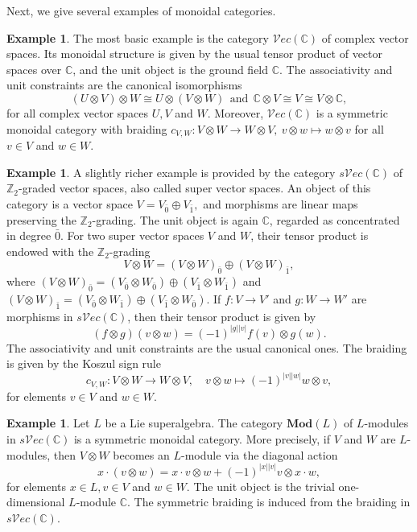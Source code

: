 \documentclass[11pt]{amsart}
\newcommand{\bbC}{\mathbb{C}}
\newcommand{\bbZ}{\mathbb{Z}}
\theoremstyle{definition}
\newtheorem{exam}[theo]{Example}
\numberwithin{equation}{section}
\begin{document}
Next, we give several examples of monoidal categories.
		
\begin{exam}
The most basic example is the category $\mathcal{V}ec(\bbC)$ of complex vector spaces. 
Its monoidal structure is given by the usual tensor product of vector spaces over $\mathbb{C}$, and the unit object is the ground field $\mathbb{C}$. 
The associativity and unit constraints are the canonical isomorphisms
 \[(U\otimes V) \otimes W \cong U\otimes (V\otimes W) \ \  \mathrm{and} \ \ \bbC\otimes V \cong V \cong V\otimes \bbC,   \]
for all complex vector spaces $U,V$ and $W$. 
Moreover, $\mathcal{V}ec(\bbC)$ is a symmetric monoidal category with braiding $c_{V,W}: V\otimes W \to W\otimes V, \ v\otimes w \mapsto w \otimes v$ for all $v\in V$ and $w \in W$.
\end{exam}
		
\begin{exam}
A slightly richer example is provided by the category $s\mathcal{V}ec(\bbC)$ of $\bbZ_2$-graded vector spaces, also called super vector spaces. 
An object of this category is a vector space $V=V_{\bar 0}\oplus V_{\bar 1},$ and morphisms are linear maps preserving the $\mathbb{Z}_2$-grading. The unit object is again $\mathbb{C}$, regarded as concentrated in degree $\bar 0$.
For two super vector spaces $V$ and $W$, their tensor product is endowed with the $\mathbb{Z}_2$-grading
\[
V\otimes W=(V\otimes W)_{\bar 0}\oplus (V\otimes W)_{\bar 1},
\]
where
$(V\otimes W)_{\bar 0}
=(V_{\bar 0}\otimes W_{\bar 0})
\oplus
(V_{\bar 1}\otimes W_{\bar 1})
$
and
$(V\otimes W)_{\bar 1}
=(V_{\bar 0}\otimes W_{\bar 1})
\oplus
(V_{\bar 1}\otimes W_{\bar 0}).
$
If $f:V\to V'$ and $g:W\to W'$ are morphisms in $s\mathcal{V}ec(\mathbb{C})$, then their tensor product is given by
\[
(f\otimes g)(v\otimes w)=(-1)^{|g||v|}f(v)\otimes g(w).
\]
The associativity and unit constraints are the usual canonical ones. The braiding is given by the Koszul sign rule
\[
c_{V,W}:V\otimes W\longrightarrow W\otimes V,
\quad
v\otimes w\longmapsto (-1)^{|v||w|}w\otimes v,
\]
for elements $v\in V$ and $w\in W$.
\end{exam}
		
\begin{exam}
Let $L$ be a Lie superalgebra. The category $\mathbf{Mod}(L)$ of  $L$-modules in $s\mathcal{V}ec(\mathbb{C})$ is a symmetric monoidal category. More precisely, if $V$ and $W$ are $L$-modules, then $V\otimes W$ becomes an $L$-module via the diagonal action
\[
x\cdot (v\otimes w)
=
x\cdot v\otimes w
+
(-1)^{|x||v|}v\otimes x\cdot w,
\]
for elements $x\in L, v\in V$ and $w\in W$. The unit object is the trivial one-dimensional $L$-module $\mathbb{C}$. The symmetric braiding is induced from the braiding in $s\mathcal{V}ec(\mathbb{C})$. 
\end{exam}
\end{document}

